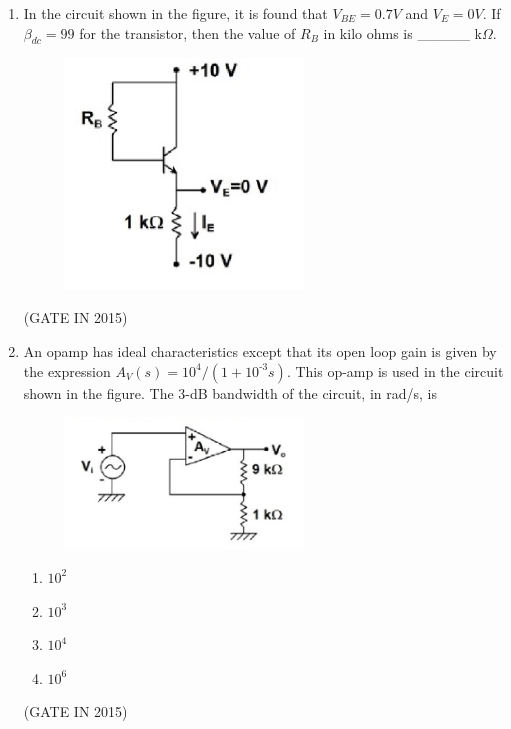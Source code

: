 \documentclass[journal]{IEEEtran}
\begin{document}
\begin{enumerate}
\item In the circuit shown in the figure, it is found that $V_{BE} = 0.7 V$ and $V_E = 0 V$. If $\beta_{dc} = 99$ for the transistor, then the value of $R_B$ in kilo ohms is \_\_\_\_\_ k$\Omega$.
\begin{figure}[H]
    \centering
      \includegraphics[width=0.6\textwidth]{20.png} 
      \caption{}
    \label{fig:fig20} 
\end{figure}
 \hfill(GATE IN 2015)

\item An opamp has ideal characteristics except that its open loop gain is given by the expression $A_V(s) = 10^4/(1 + 10^\text{-3}s)$. This op-amp is used in the circuit shown in the figure. The 3-dB bandwidth of the circuit, in rad/s, is
\begin{figure}[H]
    \centering
      \includegraphics[width=0.6\textwidth]{21.png} 
      \caption{}
    \label{fig:fig21} 
\end{figure}
\begin{multicols}{4}
\begin{enumerate}
\item $10^2$
\item $10^3$
\item $10^4$
\item $10^6$
\end{enumerate}
  \end{multicols} \hfill(GATE IN 2015)


\end{enumerate}
\end{document}
